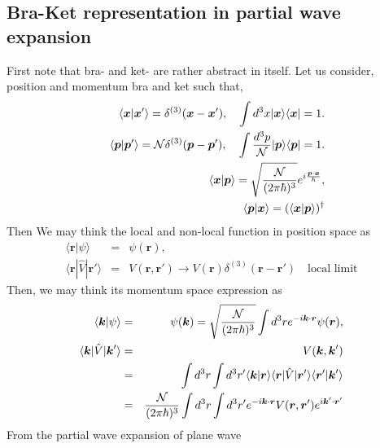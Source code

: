 \documentclass[10pt]{book}
\def\bm{\boldsymbol}
\newcommand{\bea}{\begin{eqnarray}}
\newcommand{\eea}{\end{eqnarray}}
\newcommand{\no}{\nonumber \\}
\def\vp{{\bm p}}
\def\vk{{\bm k}}
\def\vx{{\bm x}}
\def\vr{{\bm r}}
\def\la{\langle}
\def\ra{\rangle}
\begin{document}
\subsection{Bra-Ket representation in partial wave expansion}
First note that bra- and ket- are rather abstract in itself. 
Let us consider, position and momentum bra and ket such that,
\bea 
& &\la \vx|\vx'\ra =\delta^{(3)}(\vx-\vx'),\quad \int d^3 x |\vx\ra \la \vx|=1. \no 
& &\la \vp|\vp'\ra ={\cal N}\delta^{(3)}(\vp-\vp'),\quad \int \frac{d^3 p}{\cal N} |\vp\ra \la \vp|=1. \no 
& &\la \vx|\vp\ra =\sqrt{\frac{\cal N}{(2\pi\hbar)^3}} e^{i\frac{\vp\cdot\vx}{\hbar}} ,\no 
& &\la \vp|\vx\ra =  (\la \vx|\vp\ra)^\dagger            
\eea 
Then We may think the local and non-local function in position space as
\bea 
\la \vr|\psi\ra&=& \psi(\vr), \no 
\la \vr|\hat{V}|\vr'\ra&=& V(\vr,\vr') \to V(\vr)\delta^{(3)}(\vr-\vr')\quad \mbox{local limit}
\eea 
Then, we may think its momentum space expression as
\bea 
\la \vk|\psi\ra&=& \psi(\vk)=\sqrt{\frac{\cal N}{(2\pi\hbar)^3}}\int d^3 r e^{-i\vk\cdot\vr}\psi(\vr),\no 
\la \vk|\hat{V}|\vk'\ra&=& V(\vk,\vk')  \no 
           &=&\int d^3 r \int d^3 r' \la \vk|\vr\ra \la \vr|\hat{V}|\vr'\ra \la \vr'|\vk'\ra \no 
           &=&\frac{\cal N}{(2\pi\hbar)^3} \int d^3 r \int d^3 r' e^{-i\vk\cdot\vr} V(\vr,\vr')e^{i\vk'\cdot\vr'}
\eea 
From the partial wave expansion of plane wave
\end{document}
